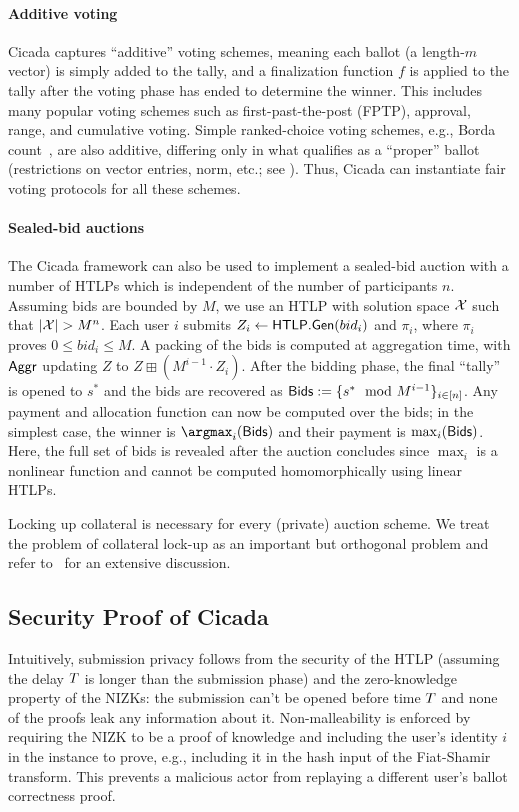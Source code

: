 

\paragraph{Additive voting}
Cicada captures ``additive'' voting schemes, meaning each ballot (a length-$m$ vector) is simply added to the tally, and a finalization function $f$ is applied to the tally after the voting phase has ended to determine the winner. 
This includes many popular voting schemes such as first-past-the-post (FPTP), approval, range, and cumulative voting. Simple ranked-choice voting schemes, e.g., Borda count~\cite{Emerson13}, are also additive, differing only in what qualifies as a ``proper'' ballot (restrictions on vector entries, norm, etc.; see ). 
Thus, Cicada can instantiate fair voting protocols for all these schemes.

\paragraph{Sealed-bid auctions}
The Cicada framework can also be used to implement a sealed-bid auction with a number of HTLPs which is independent of the number of participants $n$. 
Assuming bids are bounded by $M$, we use an HTLP with solution space $\mathcal{X}$ such that $\lvert \mathcal{X} \rvert > M^n$.
Each user $i$ submits $Z_i \gets \mathsf{HTLP}.{\sf Gen}({bid}_i)$ and $\pi_i$, where $\pi_i$ proves $0 \leq {bid}_i \leq M$. A packing of the bids is computed at aggregation time, with $\mathsf{Aggr}$ updating $Z$ to $Z \boxplus (M^{i-1} \cdot Z_i)$. After the bidding phase, the final ``tally'' is opened to $s^*$ and the bids are recovered as ${\sf Bids} := \{ s^* \mod{M^{i-1}} \}_{i \in [n]}$. Any payment and allocation function can now be computed over the bids; in the simplest case, the winner is $\argmax_i ({\sf Bids})$ and their payment is $\max_i ({\sf Bids})$. Here, the full set of bids is revealed after the auction concludes since $\max_i$ is a nonlinear function and cannot be computed homomorphically using linear HTLPs.

Locking up collateral is necessary for every (private) auction scheme. We treat the problem of collateral lock-up as an important but orthogonal problem and refer to~\cite{CCS:TAFWBM23} for an extensive discussion.

\subsection{Security Proof of Cicada}
Intuitively, submission privacy follows from the security of the HTLP (assuming the delay $T$ is longer than the submission phase) and the zero-knowledge property of the NIZKs: the submission can't be opened before time $T$ and none of the proofs leak any information about it. Non-malleability is enforced by requiring the NIZK to be a proof of knowledge and including the user's identity $i$ in the instance to prove, e.g., including it in the hash input of the Fiat-Shamir transform. This prevents a malicious actor from replaying a different user's ballot correctness proof.

